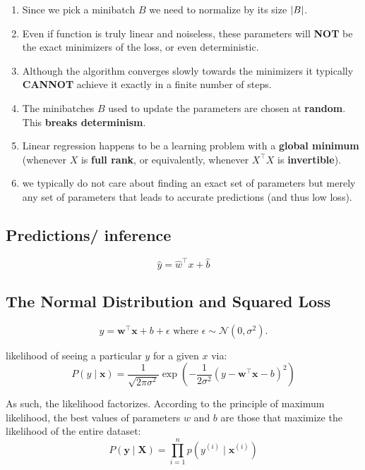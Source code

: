 \vspace{0.5cm}
\begin{enumerate}[itemsep=0.2cm]
    \item Since we pick a minibatch $B$ we need to normalize by its size $\left| B \right|$.

    \item Even if function is truly linear and noiseless, these parameters will \textbf{NOT} be the exact minimizers of the loss, or even deterministic. 
    
    \item Although the algorithm converges slowly towards the minimizers it typically \textbf{CANNOT} achieve it exactly in a finite number of steps. 
    
    \item The minibatches $B$ used to update the parameters are chosen at \textbf{random}. This \textbf{breaks determinism}.

    \item Linear regression happens to be a learning problem with a \textbf{global minimum} (whenever $X$ is \textbf{full rank}, or equivalently, whenever $X^\top X$ is \textbf{invertible}).

    \item we typically do not care about finding an exact set of parameters but merely any set of parameters that leads to accurate predictions (and thus low loss).
\end{enumerate}


\subsection{Predictions/ inference \cite{dnn-1}}
\[
    \hat{y} = \hat{w}^\top x + \hat{b}
\]

\subsection{The Normal Distribution and Squared Loss \cite{dnn-1}}

\[
    y = \mathbf{w}^\top \mathbf{x} + b + \epsilon 
    \textrm{ where } 
    \epsilon \sim \mathcal{N}(0, \sigma^2).
\]

likelihood of seeing a particular $y$ for a given $x$ via:
\[
    \displaystyle
    P(y \mid \mathbf{x}) = \frac{1}{\sqrt{2 \pi \sigma^2}} \exp\left(-\frac{1}{2 \sigma^2} (y - \mathbf{w}^\top \mathbf{x} - b)^2\right)
\]

As such, the likelihood factorizes. According to the principle of maximum likelihood, the best values of parameters $w$ and $b$ are those that maximize the likelihood of the entire dataset:
\[
    \displaystyle
    P(\mathbf y \mid \mathbf X) = \prod_{i=1}^{n} p(y^{(i)} \mid \mathbf{x}^{(i)})
\]

